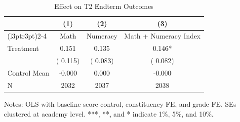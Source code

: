 \begin{table}[!htbp]
\centering
\caption{Effect on T2 Endterm Outcomes}
\label{tab:ng_t2_ete}
\begin{threeparttable}
\begin{tabular}[t]{lccc}
\toprule
 & (1) & (2) & (3) \\
\cmidrule(l{3pt}r{3pt}){2-4}
 & Math & Numeracy & Math + Numeracy Index \\
\midrule
Treatment &   0.151 &   0.135 &   0.146* \\
 & (  0.115) & (  0.083) & (  0.082) \\
\addlinespace
Control Mean &  -0.000 &   0.000 &  -0.000 \\
N & 2032 & 2037 & 2038 \\
\bottomrule
\end{tabular}
\begin{tablenotes}[para]
\item Notes: OLS with baseline score control, constituency FE, and grade FE.
SEs clustered at academy level. ***, **, and * indicate 1\%, 5\%, and 10\%.
\end{tablenotes}
\end{threeparttable}
\end{table}
